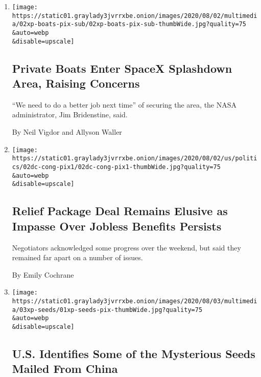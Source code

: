 \begin{enumerate}
\def\labelenumi{\arabic{enumi}.}
\item
  \href{/2020/08/02/us/flag-boat-SpaceX.html}{}

  \texttt{[image: https://static01.graylady3jvrrxbe.onion/images/2020/08/02/multimedia/02xp-boats-pix-sub/02xp-boats-pix-sub-thumbWide.jpg?quality=75\\\&auto=webp\\\&disable=upscale]}

  \hypertarget{private-boats-enter-spacex-splashdown-area-raising-concerns}{%
  \subsection{Private Boats Enter SpaceX Splashdown Area, Raising
  Concerns}\label{private-boats-enter-spacex-splashdown-area-raising-concerns}}

  ``We need to do a better job next time'' of securing the area, the
  NASA administrator, Jim Bridenstine, said.

  By Neil Vigdor and Allyson Waller
\item
  \href{/2020/08/02/us/politics/coronavirus-jobless-aid.html}{}

  \texttt{[image: https://static01.graylady3jvrrxbe.onion/images/2020/08/02/us/politics/02dc-cong-pix1/02dc-cong-pix1-thumbWide.jpg?quality=75\\\&auto=webp\\\&disable=upscale]}

  \hypertarget{relief-package-deal-remains-elusive-as-impasse-over-jobless-benefits-persists}{%
  \subsection{Relief Package Deal Remains Elusive as Impasse Over
  Jobless Benefits
  Persists}\label{relief-package-deal-remains-elusive-as-impasse-over-jobless-benefits-persists}}

  Negotiators acknowledged some progress over the weekend, but said they
  remained far apart on a number of issues.

  By Emily Cochrane
\item
  \href{/2020/08/02/us/Seed-packets-China-USA.html}{}

  \texttt{[image: https://static01.graylady3jvrrxbe.onion/images/2020/08/03/multimedia/03xp-seeds/01xp-seeds-pix-thumbWide.jpg?quality=75\\\&auto=webp\\\&disable=upscale]}

  \hypertarget{us-identifies-some-of-the-mysterious-seeds-mailed-from-china}{%
  \subsection{U.S. Identifies Some of the Mysterious Seeds Mailed From
  China}\label{us-identifies-some-of-the-mysterious-seeds-mailed-from-china}}


\end{enumerate}
